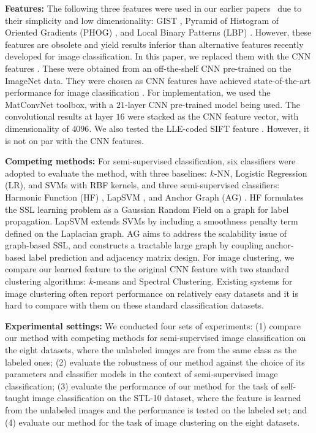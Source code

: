 \documentclass[preprint,12pt,3p]{elsarticle}
\begin{document}
\textbf{Features:} The following three features were used in our
earlier papers~\citep{dai:eccv12b, dai:iccv13b} due to their simplicity and low dimensionality: GIST
\citep{gist}, Pyramid of Histogram of Oriented Gradients (PHOG)
\citep{Bosch:iccv07}, and Local Binary Patterns (LBP)
\citep{Ojala02}. However, these features are obsolete and yield
 results inferior than alternative features recently developed  for image
classification. 
In this paper, we replaced them with the CNN features \citep{caffe14, deep:bmvc14}. 
These were obtained from an off-the-shelf CNN pre-trained on the ImageNet data. 
They were chosen as CNN features
have achieved state-of-the-art performance for image classification
\citep{nips12:cnn, cnnfet14}. For implementation, we used the
MatConvNet \citep{MatConvNet} toolbox, with a $21$-layer CNN
pre-trained model being used. The convolutional results at layer $16$ were
stacked as the CNN feature vector, with dimensionality of $4096$.  We
also tested the LLE-coded SIFT feature \citep{siftllc:cvpr10}. However,
it is not on par with the CNN features.
 


\textbf{Competing methods:} For semi-supervised classification, six
classifiers were adopted to evaluate the method, with three baselines:
$k$-NN, Logistic Regression (LR), and SVMs with RBF kernels, and three
semi-supervised classifiers: Harmonic Function (HF)
\citep{Zhu:Harmonic:03}, LapSVM \citep{Belkin:semiframe:2006}, and
Anchor Graph (AG) \citep{icml10:large:graph:ssl}. HF formulates the SSL
learning problem as a Gaussian Random Field on a graph for label
propagation. LapSVM extends SVMs by including a smoothness penalty
term defined on the Laplacian graph. AG aims to address the
scalability issue of graph-based SSL, and constructs a tractable large
graph by coupling anchor-based label prediction and adjacency matrix
design.  For image clustering, we compare our learned feature to the
original CNN feature with two standard clustering algorithms: $k$-means
and Spectral Clustering. Existing systems for image clustering often
report performance on relatively easy datasets and it is hard to compare
with them on these standard classification datasets.


\textbf{Experimental settings:} We conducted four sets of experiments:
(1) compare our method with competing methods for semi-supervised
image classification on the eight datasets, where the unlabeled images
are from the same class as the labeled ones; (2) evaluate the
robustness of our method against the choice of its parameters and classifier models
in the context of semi-supervised image classification; (3) evaluate
the performance of our method for the task of self-taught image
classification on the STL-10 dataset, where the feature is learned from
the unlabeled images and the performance is tested on the labeled set;
and (4) evaluate our method for the task of image clustering on the
eight datasets.
\end{document}

